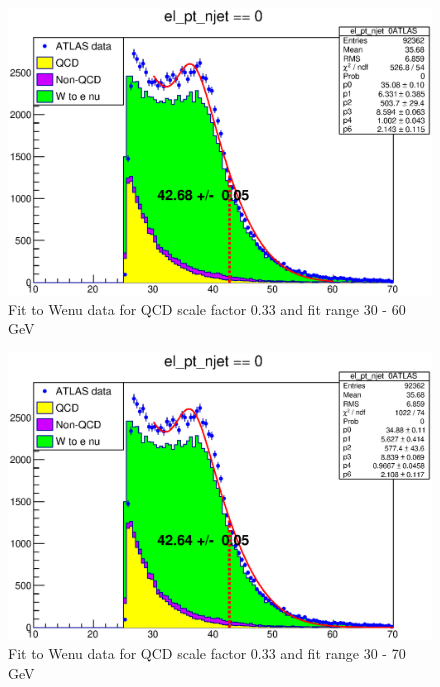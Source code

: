 \begin{figure}
\centering
\includegraphics[width=\textwidth]{data/img/halfmax_Wenu_033_i_30_60.eps}
\caption{Fit to Wenu data for QCD scale factor 0.33 and fit range 30 - 60 GeV}
\end{figure}
\begin{figure}
\centering
\includegraphics[width=\textwidth]{data/img/halfmax_Wenu_033_i_30_70.eps}
\caption{Fit to Wenu data for QCD scale factor 0.33 and fit range 30 - 70 GeV}
\end{figure}
